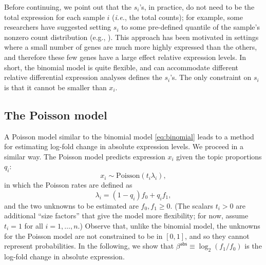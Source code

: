 \documentclass[final]{siamart171218}
\begin{document}
Before continuing, we point out that the $s_i$'s, in practice, do not
need to be the total expression for each sample $i$ ({\em i.e.}, the
total counts); for example, some researchers have suggested setting
$s_i$ to some pre-defined quantile of the sample's nonzero count
distribution (e.g., \cite{bullard-2010}). This approach has been
motivated in settings where a small number of genes are much more
highly expressed than the others, and therefore these few genes have a
large effect relative expression levels. In short, the binomial model
is quite flexible, and can accommodate different relative differential
expression analyses defines the $s_i$'s. The only constraint on $s_i$
is that it cannot be smaller than $x_i$.

\subsection{The Poisson model}

A Poisson model similar to the binomial model \eqref{eq:binomial}
leads to a method for estimating log-fold change in absolute
expression levels. We proceed in a similar way. The Poisson model
predicts expression $x_i$ given the topic proportions $q_i$:
\begin{equation}
x_i \sim \mathrm{Poisson}(t_i \lambda_i),
\label{eq:poisson}
\end{equation}
in which the Poisson rates are defined as
\begin{equation}
\lambda_i = (1 - q_i) f_0 + q_i f_1,
\end{equation}
and the two unknowns to be estimated are $f_0, f_1 \geq 0$. (The
scalars $t_i > 0$ are additional ``size factors'' that give the model
more flexibility; for now, assume $t_i = 1$ for all $i = 1, \ldots,
n$.) Observe that, unlike the binomial model, the unknowns for the
Poisson model are not constrained to be in $[0, 1]$, and so they
cannot represent probabilities. In the following, we show that
$\beta^{\mathsf{abs}} \equiv \log_2(f_1/f_0)$ is the log-fold change
in absolute expression.
\end{document}
